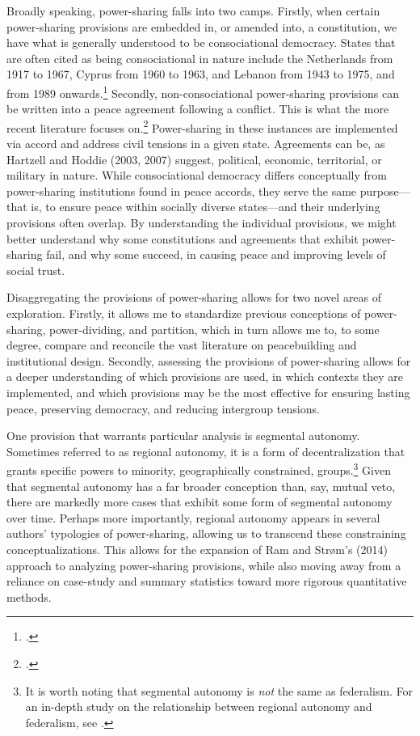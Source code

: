 \documentclass[12pt]{article}
\begin{document}
Broadly speaking, power-sharing falls into two camps. Firstly, when certain power-sharing provisions are embedded in, or amended into, a constitution, we have what is generally understood to be consociational democracy. States that are often cited as being consociational in nature include the Netherlands from 1917 to 1967, Cyprus from 1960 to 1963, and Lebanon from 1943 to 1975, and from 1989 onwards.\footcite{andeweg_consociational_2000, lijphart_consociational_1977, picard_political_2000} Secondly, non-consociational power-sharing provisions can be written into a peace agreement following a conflict. This is what the more recent literature focuses on.\footcite{strom_inclusion_2017, graham_safeguarding_2017, jarstad_words_2008, mukherjee_why_2006} Power-sharing in these instances are implemented via accord and address civil tensions in a given state. Agreements can be, as Hartzell and Hoddie (2003, 2007) suggest, political, economic, territorial, or military in nature. While consociational democracy differs conceptually from power-sharing institutions found in peace accords, they serve the same purpose---that is, to ensure peace within socially diverse states---and their underlying provisions often overlap. By understanding the individual provisions, we might better understand why some constitutions and agreements that exhibit power-sharing fail, and why some succeed, in causing peace and improving levels of social trust. 

Disaggregating the provisions of power-sharing allows for two novel areas of exploration. Firstly, it allows me to standardize previous conceptions of power-sharing, power-dividing, and partition, which in turn allows me to, to some degree, compare and reconcile the vast literature on peacebuilding and institutional design. Secondly, assessing the provisions of power-sharing allows for a deeper understanding of which provisions are used, in which contexts they are implemented, and which provisions may be the most effective for ensuring lasting peace, preserving democracy, and reducing intergroup tensions. 

One provision that warrants particular analysis is segmental autonomy. Sometimes referred to as regional autonomy, it is a form of decentralization that grants specific powers to minority, geographically constrained, groups.\footnote{It is worth noting that segmental autonomy is \textit{not} the same as federalism. For an in-depth study on the relationship between regional autonomy and federalism, see \cite{lluch_autonomism_2012}.} Given that segmental autonomy has a far broader conception than, say, mutual veto, there are markedly more cases that exhibit some form of segmental autonomy over time. Perhaps more importantly, regional autonomy appears in several authors' typologies of power-sharing, allowing us to transcend these constraining conceptualizations. This allows for the expansion of Ram and Strøm’s (2014) approach to analyzing power-sharing provisions, while also moving away from a reliance on case-study and summary statistics toward more rigorous quantitative methods.
\end{document}
